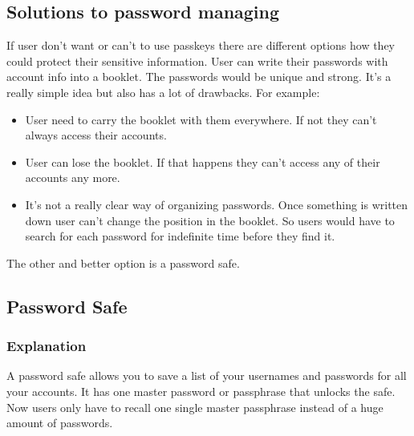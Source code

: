 \documentclass[conference]{IEEEtran}
\begin{document}
\subsection{Solutions to password managing}
If user don't want or can't to use passkeys there are different options how they could protect their sensitive information. User can write their passwords with account info into a booklet. The passwords would be unique and strong. It's a really simple idea but also has a lot of drawbacks. 
For example:
\begin{itemize}
\item User need to carry the booklet with them everywhere. If not they can't always access their accounts.
\item User can lose the booklet. If that happens they can't access any of their accounts any more.
\item It's not a really clear way of organizing passwords. Once something is written down user can't change the position in the booklet. So users would have to search for each password for indefinite time before they find it.
\end{itemize}
The other and better option is a password safe.  

\subsection{Password Safe}
\subsubsection{Explanation}
A password safe allows you to save a list of your usernames and passwords for all your accounts. It has one master password or passphrase that unlocks the safe. Now users only have to recall one single master passphrase instead of a huge amount of passwords.
\end{document}
